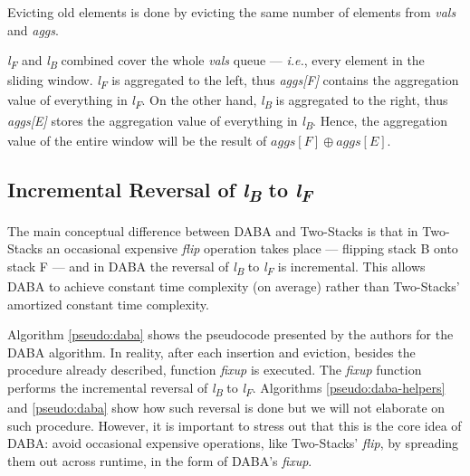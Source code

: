 Evicting old elements is done by evicting the same number of elements from \textit{vals} and \textit{aggs}.

\textit{l\textsubscript{F}} and \textit{l\textsubscript{B}} combined cover the whole \textit{vals} queue --- \textit{i.e.}, every element in the sliding window. \textit{l\textsubscript{F}} is aggregated to the left, thus \textit{aggs[F]} contains the aggregation value of everything in \textit{l\textsubscript{F}}. On the other hand, \textit{l\textsubscript{B}} is aggregated to the right, thus \textit{aggs[E]} stores the aggregation value of everything in \textit{l\textsubscript{B}}. Hence, the aggregation value of the entire window will be the result of \textit{$aggs[F] \oplus aggs[E]$}.


\subsection*{Incremental Reversal of \textit{l\textsubscript{B}} to \textit{l\textsubscript{F}}}

The main conceptual difference between DABA and Two-Stacks is that in Two-Stacks an occasional expensive \textit{flip} operation takes place --- flipping stack B onto stack F --- and in DABA the reversal of \textit{l\textsubscript{B}} to \textit{l\textsubscript{F}} is incremental. This allows DABA to achieve constant time complexity (on average) rather than Two-Stacks' amortized constant time complexity.

Algorithm \ref{pseudo:daba} shows the pseudocode presented by the authors for the DABA algorithm. In reality, after each insertion and eviction, besides the procedure already described, function \textit{fixup} is executed. The \textit{fixup} function performs the incremental reversal of \textit{l\textsubscript{B}} to \textit{l\textsubscript{F}}. Algorithms \ref{pseudo:daba-helpers} and \ref{pseudo:daba} show how such reversal is done but we will not elaborate on such procedure. However, it is important to stress out that this is the core idea of DABA: avoid occasional expensive operations, like Two-Stacks' \textit{flip}, by spreading them out across runtime, in the form of DABA's \textit{fixup}.

